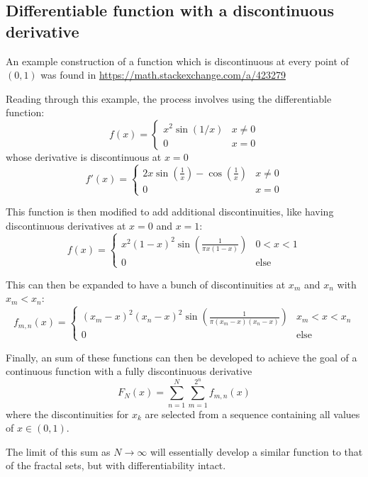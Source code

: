 \documentclass[]{article}
\begin{document}
\subsection*{Differentiable function with a discontinuous derivative}
An example construction of a function which is discontinuous at every point of $(0,1)$ was found in \url{https://math.stackexchange.com/a/423279}

Reading through this example, the process involves using the differentiable function:
\[
    f(x) = \begin{cases}
        x^2 \sin(1/x) & x \neq 0\\
        0 & x = 0        
    \end{cases}
\]
whose derivative is discontinuous at $x = 0$
\[
    f'(x) = \begin{cases}
        2 x \sin(\frac{1}{x}) - \cos(\frac{1}{x}) & x \neq 0\\
        0 & x = 0
    \end{cases}
\]

This function is then modified to add additional discontinuities,
like having discontinuous derivatives at $x = 0$ and $x = 1$:
\[
    f(x) = \begin{cases}
        x^2 (1 - x)^2 \sin(\frac{1}{\pi x (1-x)}) & 0 < x < 1\\
        0 & \text{else}
    \end{cases}
\]

This can then be expanded to have a bunch of discontinuities at $x_m$ and $x_n$ with $x_m < x_n$:
\[
    f_{m,n}(x) = \begin{cases}
        (x_m - x)^2 (x_n - x)^2 \sin(\frac{1}{\pi (x_m - x) (x_n - x)}) & x_m < x < x_n\\
        0 &\text{else}
    \end{cases}
\]

Finally, an sum of these functions can then be developed to achieve the goal of a continuous function with a fully discontinuous derivative
\[
    F_N(x) = \sum_{n = 1}^{N} \sum_{m=1}^{2^n} f_{m,n}(x)
\]
where the discontinuities for $x_k$ are selected from a sequence containing all values of $x \in (0,1)$.

The limit of this sum as $N \to \infty$ will essentially develop a similar function to that of the fractal sets, but with differentiability intact.
\end{document}
